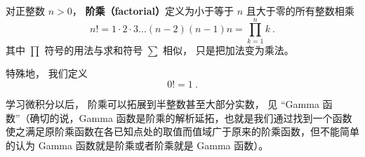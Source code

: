 
\begin{issues}
\issueDraft
\end{issues}

对正整数 $n > 0$， \textbf{阶乘（factorial）}定义为小于等于 $n$ 且大于零的所有整数相乘
\begin{equation}
n! = 1 \cdot 2 \cdot 3 \dots (n - 2) (n - 1)n = \prod_{k = 1}^n k~.
\end{equation}
其中 $\prod$ 符号的用法与求和符号 $\sum$ 相似， 只是把加法变为乘法。 %

特殊地， 我们定义
\begin{equation}
0! = 1~.
\end{equation}

学习微积分以后， 阶乘可以拓展到半整数甚至大部分实数， 见 “Gamma 函数”（确切的说，Gamma 函数是阶乘的解析延拓，也就是我们通过找到一个函数使之满足原阶乘函数在各已知点处的取值而值域广于原来的阶乘函数，但不能简单的认为 Gamma 函数就是阶乘或者阶乘就是 Gamma 函数）。
